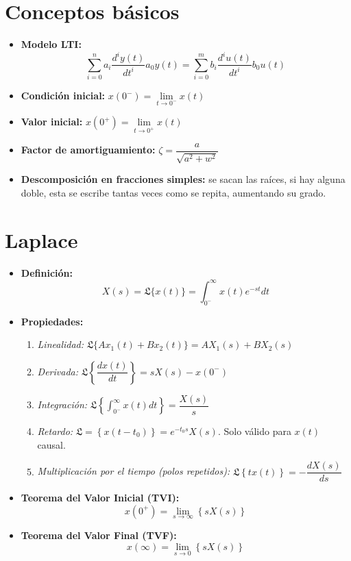 \documentclass[a4paper, twocolumn, 10pt]{article}
\newlength{\du}
\begin{document}
	
\setlength{\belowdisplayskip}{0pt} \setlength{\belowdisplayshortskip}{0pt} 
\setlength{\abovedisplayskip}{0pt} \setlength{\abovedisplayshortskip}{0pt} %
	
\section{Conceptos básicos}

\begin{itemize}
	\item \textbf{Modelo LTI:} \[\sum_{i=0}^{n}a_i\dfrac{d^iy(t)}{dt^i} a_0y(t) = \sum_{i=0}^{m}b_i\dfrac{d^iu(t)}{dt^i} b_0u(t)\]
	\item \textbf{Condición inicial:} $x(0^-) = \lim\limits_{t\rightarrow0^-}x(t)$
	\item \textbf{Valor inicial:} $x(0^+) = \lim\limits_{t\rightarrow0^+}x(t)$
	\item \textbf{Factor de amortiguamiento:} $\zeta = \dfrac{a}{\sqrt{a^2+w^2}}$
	\item \textbf{Descomposición en fracciones simples:} se sacan las raíces, si hay alguna doble, esta se escribe tantas veces como se repita, aumentando su grado.
\end{itemize}

\section{Laplace}

\begin{itemize}
	\item \textbf{Definición:} \[X(s) = \mathfrak{L}\{x(t)\} = \int_{0^-}^{\infty}x(t)e^{-st}dt\]
	\item \textbf{Propiedades:} 
	\begin{enumerate}
		\item \textit{Linealidad:} $\mathfrak{L}\{Ax_1(t) +Bx_2(t)\} = AX_1(s) + BX_2(s)$
		\item \textit{Derivada:} $\mathfrak{L}\left\{\dfrac{dx(t)}{dt}\right\} = sX(s) - x(0^-)$
		\item \textit{Integración:} $\mathfrak{L}\left\{\int_{0^-}^{\infty}x(t)dt\right\} = \dfrac{X(s)}{s}$
		\item \textit{Retardo:} $\mathfrak{L} = \left\{x(t-t_0)\right\} = e^{-t_0s}X(s)$. Solo válido para $x(t)$ causal.
		\item \textit{Multiplicación por el tiempo (polos repetidos):} $\mathfrak{L}\left\{tx(t)\right\} = -\dfrac{dX(s)}{ds}$
	\end{enumerate}
	\item \textbf{Teorema del Valor Inicial (TVI):} \[x(0^+) = \lim\limits_{s\rightarrow\infty}\left\{sX(s)\right\}\]
	\item \textbf{Teorema del Valor Final (TVF):} \[x(\infty) = \lim\limits_{s\rightarrow0}\left\{sX(s)\right\}\]
\end{itemize}
\end{document}
